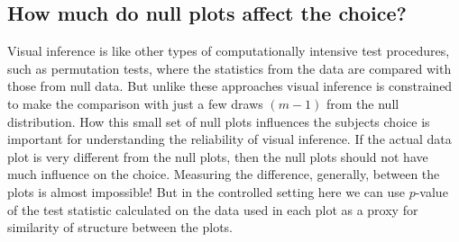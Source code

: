 \documentclass[12pt]{article}
\newcommand{\green}[1]{{\color{green} #1}} %
\begin{document}




\subsection{How much do null plots affect the choice?}

Visual inference is like other types of computationally intensive test procedures, such as permutation tests, where the statistics from the data are compared with those from null data. But unlike these approaches visual inference is constrained to make the comparison with just a few draws $(m-1)$ from the null distribution. How this small set of null plots influences the subjects choice is important for understanding the reliability of visual inference. If the actual data plot is very different from the null plots, then the null plots should not have much influence on the choice. Measuring the difference, generally, between the plots is almost impossible! But in the controlled setting here we can use $p$-value of the test statistic calculated on the data used in each plot as a proxy for similarity of structure between the plots. 
\end{document}
